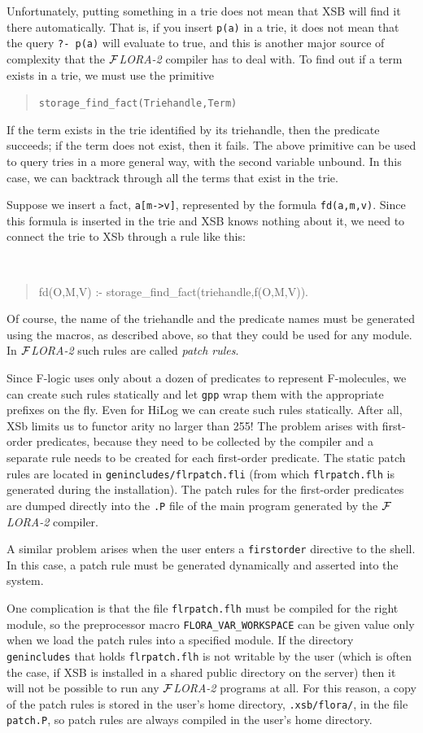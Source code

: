 \documentclass[11pt]{article}
\newcommand{\FLORA}{{\mbox{${\cal F}${\small\it LORA}\rm\emph{-2}}}\xspace}
\newcommand{\fl}{\mbox{F-logic}\xspace}
\begin{document}
Unfortunately, putting something in a trie does not mean that XSB will find
it there automatically. That is, if you insert {\tt p(a)} in a trie, it
does not mean that the query {\tt ?- p(a)} will evaluate to true, and this
is another major source of complexity that the \FLORA compiler has to deal
with. To find out if a term exists in a trie, we must use the primitive
\begin{quote}
 \tt storage\_find\_fact(Triehandle,Term)  
\end{quote}
If the term exists in the trie identified by its triehandle, then the
predicate succeeds; if the term does not exist, then it fails. The above
primitive can be used to query tries in a more general way, with the second
variable unbound. In this case, we can backtrack through all the terms that
exist in the trie.

Suppose we insert a fact, {\tt a[m->v]}, represented by the formula
{\tt fd(a,m,v)}. Since this formula is inserted in the trie and XSB knows
nothing about it, we need to connect the trie to XSb through a rule like this:
{\tt
\begin{quote}
  fd(O,M,V) :- storage\_find\_fact(triehandle,f(O,M,V)).
\end{quote}
}
Of course, the name of the triehandle and the predicate names must be
generated using the macros, as described above, so that they could be used
for any module. In \FLORA such rules are called \emph{patch rules}. 

Since \fl uses only about a dozen of predicates to represent
F-molecules, we can create such rules statically and let {\tt gpp} wrap
them with the appropriate prefixes on the fly. Even for HiLog we can create
such rules statically. After all, XSb limits us to functor arity no larger
than 255! The problem arises with first-order predicates, because they need
to be collected by the compiler and a separate rule needs to be created for
each first-order predicate. The static patch rules are located in
{\tt genincludes/flrpatch.fli} (from which {\tt flrpatch.flh} is generated
during the installation).  The patch rules for the first-order
predicates are dumped directly into the {\tt .P} file of the main program
generated by the \FLORA compiler.

A similar problem arises when the user enters a {\tt firstorder} directive
to the shell. In this case, a patch rule must be generated dynamically and
asserted into the system.

One complication is that the file {\tt flrpatch.flh} must be compiled for
the right module, so the preprocessor macro {\tt FLORA\_VAR\_WORKSPACE} can
be given value only when we load the patch rules into a specified module.
If the directory {\tt genincludes} that holds {\tt flrpatch.flh} is not
writable by the user (which is often the case, if XSB is installed in a
shared public directory on the server) then it will not be possible to run
any \FLORA programs at all. For this reason, a copy of the patch rules is
stored in the user's home directory, {\tt .xsb/flora/}, in the file {\tt
  patch.P}, so patch rules are always compiled in the user's home
directory.
\end{document}
